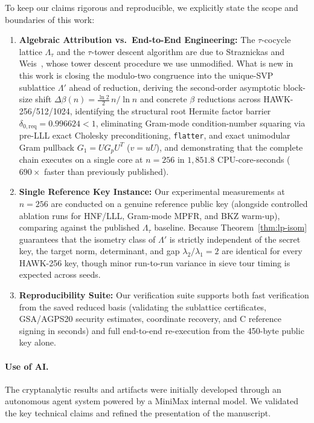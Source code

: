 \documentclass[11pt,a4paper]{article}
\theoremstyle{definition}
\newcommand{\Lt}{\Lambda_\tau}
\newcommand{\Lp}{\Lambda'}
\begin{document}
To keep our claims rigorous and reproducible, we explicitly state the scope and boundaries of this work:
\begin{enumerate}[leftmargin=*]
\item \textbf{Algebraic Attribution vs.\ End-to-End Engineering:} The $\tau$-cocycle lattice $\Lt$ and the $\tau$-tower descent algorithm are due to Straznickas and Weis~\cite{SW26}, whose tower descent procedure we use unmodified. What is new in this work is closing the modulo-two congruence into the unique-SVP sublattice $\Lp$ ahead of reduction, deriving the second-order asymptotic block-size shift $\Delta\beta(n) = \frac{\ln 2}{2}\,n/\ln n$ and concrete $\beta$ reductions across HAWK-256/512/1024, identifying the structural root Hermite factor barrier $\delta_{0,\mathrm{req}} = 0.996624 < 1$, eliminating Gram-mode condition-number squaring via pre-LLL exact Cholesky preconditioning, \texttt{flatter}, and exact unimodular Gram pullback $G_1 = U G_p U^T$ ($v = uU$), and demonstrating that the complete chain executes on a single core at $n=256$ in $1{,}851.8$ CPU-core-seconds ($690\times$ faster than previously published).
\item \textbf{Single Reference Key Instance:} Our experimental measurements at $n=256$ are conducted on a genuine reference public key (alongside controlled ablation runs for HNF/LLL, Gram-mode MPFR, and BKZ warm-up), comparing against the published $\Lt$ baseline. Because Theorem~\ref{thm:lp-isom} guarantees that the isometry class of $\Lp$ is strictly independent of the secret key, the target norm, determinant, and gap $\lambda_2/\lambda_1=2$ are identical for every HAWK-256 key, though minor run-to-run variance in sieve tour timing is expected across seeds.
\item \textbf{Reproducibility Suite:} Our verification suite supports both fast verification from the saved reduced basis (validating the sublattice certificates, GSA/AGPS20 security estimates, coordinate recovery, and C reference signing in seconds) and full end-to-end re-execution from the 450-byte public key alone.
\end{enumerate}

\paragraph{Use of AI.}
The cryptanalytic results and artifacts were initially developed through an autonomous agent system powered by a MiniMax internal model. We validated the key technical claims and refined the presentation of the manuscript.
\end{document}
